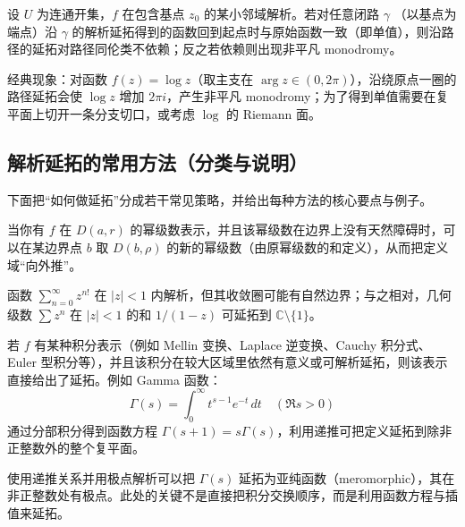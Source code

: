 \documentclass[lang=cn,10pt]{elegantbook}
\begin{document}
	\begin{definition}
		设 \(U\) 为连通开集，\(f\) 在包含基点 \(z_0\) 的某小邻域解析。若对任意闭路 \(\gamma\) （以基点为端点）沿 \(\gamma\) 的解析延拓得到的函数回到起点时与原始函数一致（即单值），则沿路径的延拓对路径同伦类不依赖；反之若依赖则出现非平凡 monodromy。
	\end{definition}
	
	\begin{example}
		经典现象：对函数 \(f(z)=\log z\)（取主支在 \(\arg z\in(0,2\pi)\)），沿绕原点一圈的路径延拓会使 \(\log z\) 增加 \(2\pi i\)，产生非平凡 monodromy；为了得到单值需要在复平面上切开一条分支切口，或考虑 \(\log\) 的 Riemann 面。
	\end{example}
	
	\subsection*{解析延拓的常用方法（分类与说明）}
	下面把“如何做延拓”分成若干常见策略，并给出每种方法的核心要点与例子。
	
	\begin{definition}
		当你有 \(f\) 在 \(D(a,r)\) 的幂级数表示，并且该幂级数在边界上没有天然障碍时，可以在某边界点 \(b\) 取 \(D(b,\rho)\) 的新的幂级数（由原幂级数的和定义），从而把定义域“向外推”。
	\end{definition}
	
	\begin{example}[幂级数延拓示例]
		函数 \(\sum_{n=0}^\infty z^{n!}\) 在 \(|z|<1\) 内解析，但其收敛圈可能有自然边界；与之相对，几何级数 \(\sum z^n\) 在 \(|z|<1\) 的和 \(1/(1-z)\) 可延拓到 \(\mathbb C\setminus\{1\}\)。
	\end{example}
	
	\begin{definition}
		若 \(f\) 有某种积分表示（例如 Mellin 变换、Laplace 逆变换、Cauchy 积分式、Euler 型积分等），并且该积分在较大区域里依然有意义或可解析延拓，则该表示直接给出了延拓。例如 Gamma 函数：
		\[
		\Gamma(s)=\int_0^\infty t^{s-1}e^{-t}\,dt \quad(\Re s>0)
		\]
		通过分部积分得到函数方程 \(\Gamma(s+1)=s\Gamma(s)\)，利用递推可把定义延拓到除非正整数外的整个复平面。
	\end{definition}
	
	\begin{example}
		使用递推关系并用极点解析可以把 \(\Gamma(s)\) 延拓为亚纯函数（meromorphic），其在非正整数处有极点。此处的关键不是直接把积分交换顺序，而是利用函数方程与插值来延拓。
	\end{example}
	
\end{document}
